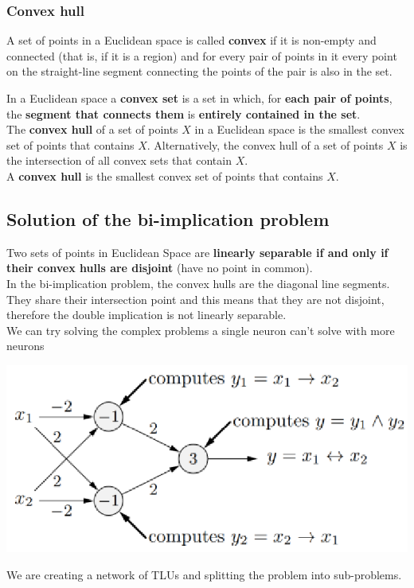 \documentclass[11pt]{article}
\begin{document}
		\subsubsection{Convex hull}
		A set of points in a Euclidean space is called \textbf{convex} if it is non-empty and connected (that is, if it is a region) and for every pair of points in it every point on the straight-line segment connecting the points of the pair is also in the set.
		
		In a Euclidean space a \textbf{convex set} is a set in which, for \textbf{each pair of points}, the \textbf{segment that connects them} is \textbf{entirely contained in the set}.\\
		
		The \textbf{convex hull} of a set of points $X$ in a Euclidean space is the smallest convex set of points that contains $X$. Alternatively, the convex hull of a set of points $X$ is the intersection of all convex sets that contain $X$.\\
		
		A \textbf{convex hull} is the smallest convex set of points that contains $X$.\\
		
		\newpage
		
		\subsection{Solution of the bi-implication problem}
		Two sets of points in Euclidean Space are \textbf{linearly separable if and only if their convex hulls are disjoint} (have no point in common).\\
		
		In the bi-implication problem, the convex hulls are the diagonal line segments. They share their intersection point and this means that they are not disjoint, therefore the double implication is not linearly separable.\\
		
		We can try solving the complex problems a single neuron can't solve with more neurons
		\begin{center}
			\includegraphics[width=0.7\columnwidth]{img/NN/TLU8}
		\end{center}
		We are creating a network of TLUs and splitting the problem into sub-problems.\\
		
\end{document}
